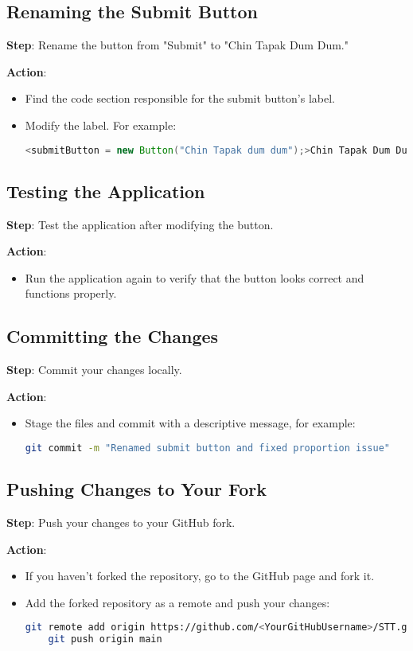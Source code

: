 \documentclass[a4paper,12pt]{article}
\begin{document}
\subsection{Renaming the Submit Button}
\textbf{Step}: Rename the button from "Submit" to "Chin Tapak Dum Dum."

\textbf{Action}:
\begin{itemize}
    \item Find the code section responsible for the submit button's label.
    \item Modify the label. For example:
    \begin{lstlisting}[language=JAVA]
    <submitButton = new Button("Chin Tapak dum dum");>Chin Tapak Dum Dum</button>
    \end{lstlisting}
\end{itemize}

\subsection{Testing the Application}
\textbf{Step}: Test the application after modifying the button.

\textbf{Action}: 
\begin{itemize}
    \item Run the application again to verify that the button looks correct and functions properly.
\end{itemize}

\subsection{Committing the Changes}
\textbf{Step}: Commit your changes locally.

\textbf{Action}:
\begin{itemize}
    \item Stage the files and commit with a descriptive message, for example:
    \begin{lstlisting}[language=bash]
    git commit -m "Renamed submit button and fixed proportion issue"
    \end{lstlisting}
\end{itemize}

\subsection{Pushing Changes to Your Fork}
\textbf{Step}: Push your changes to your GitHub fork.

\textbf{Action}:
\begin{itemize}
    \item If you haven’t forked the repository, go to the GitHub page and fork it.
    \item Add the forked repository as a remote and push your changes:
    \begin{lstlisting}[language=bash]
    git remote add origin https://github.com/<YourGitHubUsername>/STT.git
    git push origin main
    \end{lstlisting}
\end{itemize}
\end{document}
